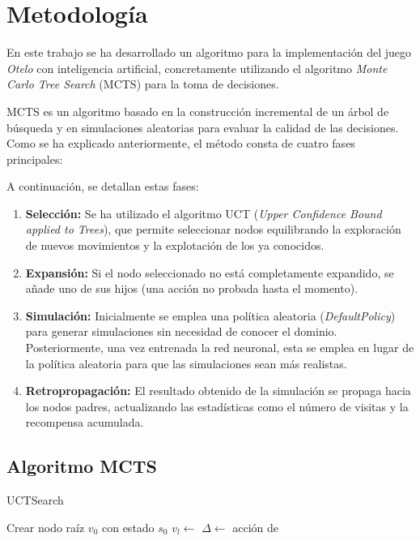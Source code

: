 \documentclass[conference,a4paper]{IEEEtran}
\begin{document}
\section{Metodología}

En este trabajo se ha desarrollado un algoritmo para la implementación del juego \textit{Otelo} con inteligencia artificial, concretamente utilizando el algoritmo \textit{Monte Carlo Tree Search} (MCTS) para la toma de decisiones.

MCTS es un algoritmo basado en la construcción incremental de un árbol de búsqueda y en simulaciones aleatorias para evaluar la calidad de las decisiones. Como se ha explicado anteriormente, el método consta de cuatro fases principales:


A continuación, se detallan estas fases:
\begin{enumerate}
    \item \textbf{Selección:} Se ha utilizado el algoritmo UCT (\textit{Upper Confidence Bound applied to Trees}), que permite seleccionar nodos equilibrando la exploración de nuevos movimientos y la explotación de los ya conocidos.
    
    \item \textbf{Expansión:} Si el nodo seleccionado no está completamente expandido, se añade uno de sus hijos (una acción no probada hasta el momento).

    \item \textbf{Simulación:} Inicialmente se emplea una política aleatoria (\textit{DefaultPolicy}) para generar simulaciones sin necesidad de conocer el dominio. Posteriormente, una vez entrenada la red neuronal, esta se emplea en lugar de la política aleatoria para que las simulaciones sean más realistas.
    
    \item \textbf{Retropropagación:} El resultado obtenido de la simulación se propaga hacia los nodos padres, actualizando las estadísticas como el número de visitas y la recompensa acumulada.
\end{enumerate}

\subsection{Algoritmo MCTS}
\begin{algorithm}[H]
\caption{UCTSearch}
\begin{algorithmic}[1]
    \State Crear nodo raíz $v_0$ con estado $s_0$
        \State $v_l \gets$ 
        \State $\Delta \gets$ 
        \State {}
    \EndWhile
    \State \Return acción de 
\EndFunction
\end{algorithmic}
\end{algorithm}
\end{document}
